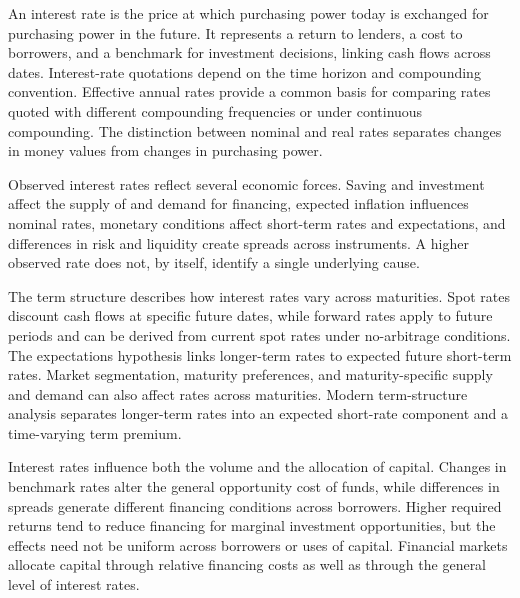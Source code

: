 

An interest rate is the price at which purchasing power today is exchanged for purchasing power in the future. It represents a return to lenders, a cost to borrowers, and a benchmark for investment decisions, linking cash flows across dates. Interest-rate quotations depend on the time horizon and compounding convention. Effective annual rates provide a common basis for comparing rates quoted with different compounding frequencies or under continuous compounding. The distinction between nominal and real rates separates changes in money values from changes in purchasing power.

Observed interest rates reflect several economic forces. Saving and investment affect the supply of and demand for financing, expected inflation influences nominal rates, monetary conditions affect short-term rates and expectations, and differences in risk and liquidity create spreads across instruments. A higher observed rate does not, by itself, identify a single underlying cause.

The term structure describes how interest rates vary across maturities. Spot rates discount cash flows at specific future dates, while forward rates apply to future periods and can be derived from current spot rates under no-arbitrage conditions. The expectations hypothesis links longer-term rates to expected future short-term rates. Market segmentation, maturity preferences, and maturity-specific supply and demand can also affect rates across maturities. Modern term-structure analysis separates longer-term rates into an expected short-rate component and a time-varying term premium.

Interest rates influence both the volume and the allocation of capital. Changes in benchmark rates alter the general opportunity cost of funds, while differences in spreads generate different financing conditions across borrowers. Higher required returns tend to reduce financing for marginal investment opportunities, but the effects need not be uniform across borrowers or uses of capital. Financial markets allocate capital through relative financing costs as well as through the general level of interest rates.


